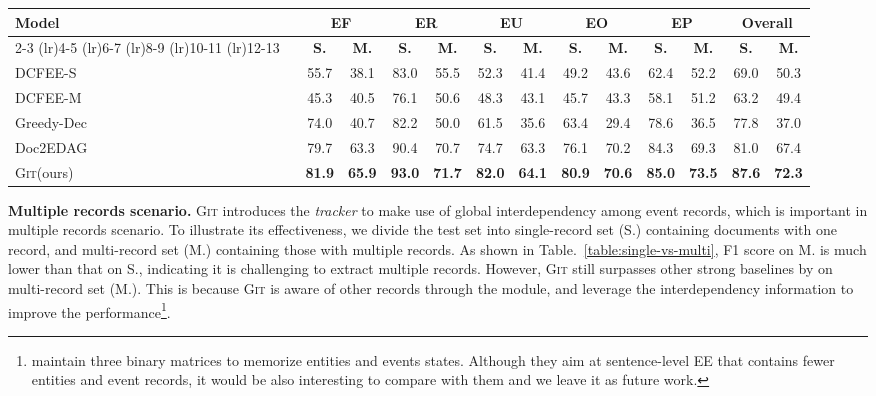 \documentclass[11pt,a4paper]{article}
\newcommand{\modelname}{\textsc{Git}\xspace}
\begin{document}
\begin{table*}[htbp]
\centering
\begin{tabular}{lcccccccccccc}
\toprule
\multirow{2}{*}{\bf Model} & \multicolumn{2}{c}{\bf EF} & \multicolumn{2}{c}{\bf ER} & \multicolumn{2}{c}{\bf EU} & \multicolumn{2}{c}{\bf EO} & \multicolumn{2}{c}{\bf EP} & \multicolumn{2}{c}{\bf Overall}\\ 
\cmidrule(lr){2-3} 
\cmidrule(lr){4-5}
\cmidrule(lr){6-7}
\cmidrule(lr){8-9}
\cmidrule(lr){10-11}
\cmidrule(lr){12-13}
~ & \bf S. & \bf M. & \bf S. &  \bf M. & \bf S. &  \bf M. & \bf S. &  \bf M. & \bf S. &  \bf M. & \bf S. &  \bf M. \\
\midrule
DCFEE-S & 55.7 & 38.1 & 83.0 & 55.5 & 52.3 & 41.4 & 49.2 & 43.6 & 62.4 & 52.2 & 69.0 & 50.3\\
DCFEE-M & 45.3 & 40.5 & 76.1 & 50.6 & 48.3 & 43.1 & 45.7 & 43.3 & 58.1 & 51.2 & 63.2 & 49.4 \\
Greedy-Dec & 74.0 & 40.7 & 82.2 & 50.0 & 61.5 & 35.6 & 63.4 & 29.4 & 78.6 & 36.5 & 77.8 & 37.0 \\
Doc2EDAG & 79.7 & 63.3 & 90.4 & 70.7 & 74.7 & 63.3 & 76.1 & 70.2 & 84.3 & 69.3 & 81.0 & 67.4\\
\midrule
\modelname (ours) & \textbf{81.9} & \textbf{65.9} & \textbf{93.0} & \textbf{71.7} & \textbf{82.0} & \textbf{64.1} & \textbf{80.9} & \textbf{70.6} & \textbf{85.0} & \textbf{73.5} & \textbf{87.6} & \textbf{72.3} \\
\bottomrule
\end{tabular}
\caption{F1 scores on single-record (S.) and multi-record (M.) sets.}
\label{table:single-vs-multi}
\end{table*}


\textbf{Multiple records scenario.}
\modelname introduces the \textit{tracker} to make use of global interdependency among event records, which is important in multiple records scenario.
To illustrate its effectiveness, we divide the test set into single-record set (S.) containing documents with one record, and multi-record set (M.) containing those with multiple records.
As shown in Table.~\ref{table:single-vs-multi}, F1 score on M. is much lower than that on S., indicating it is challenging to extract multiple records.
However, \modelname still surpasses other strong baselines by  on multi-record set (M.).
This is because \modelname is aware of other records through the  module, and leverage the interdependency information to improve the performance\footnote{
\citet{nguyen-etal-2016-joint} maintain three binary matrices to memorize entities and events states. Although they aim at sentence-level EE that contains fewer entities and event records, it would be also interesting to compare with them and we leave it as future work.}.
\end{document}
